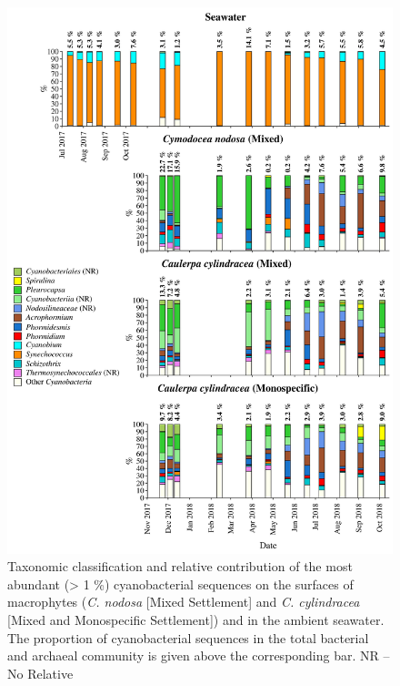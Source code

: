 \documentclass[12pt,]{article}
\begin{document}
\begin{figure}[H]

{\centering \includegraphics[width=0.85\linewidth]{../results/figures/cyanobacteria_bar_plot} 

}

\caption{Taxonomic classification and relative contribution of the most abundant (> 1 \si{\percent}) cyanobacterial sequences on the surfaces of macrophytes (\textit{C. nodosa} [Mixed Settlement] and \textit{C. cylindracea} [Mixed and Monospecific Settlement]) and in the ambient seawater. The proportion of cyanobacterial sequences in the total bacterial and archaeal community is given above the corresponding bar. NR -- No Relative\label{cyano}}\label{fig:unnamed-chunk-5}
\end{figure}
\end{document}
